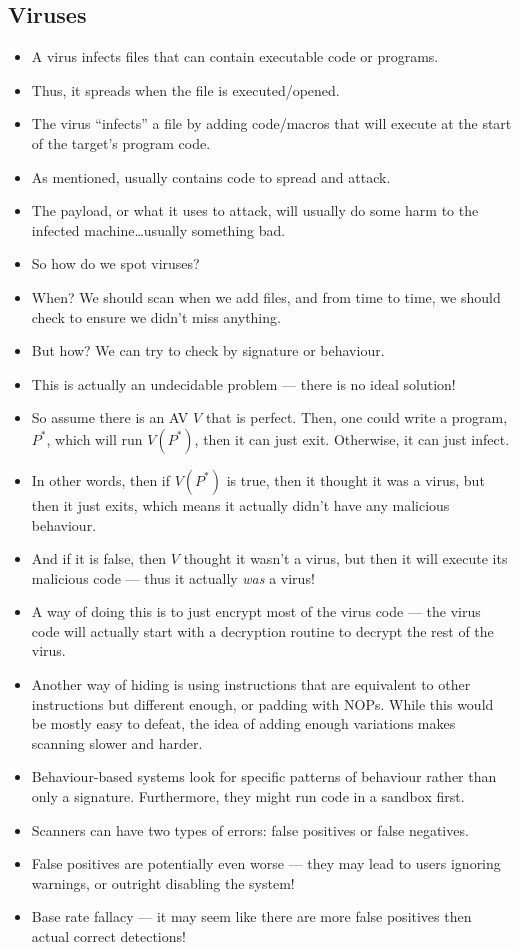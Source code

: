 \documentclass{article}
\begin{document}
\subsection{Viruses}
\begin{itemize}
    \item A virus infects files that can contain executable code or programs.
    \item Thus, it spreads when the file is executed/opened.
    \item The virus ``infects'' a file by adding code/macros that will execute at the start of the target's program code.
    \item As mentioned, usually contains code to spread and attack.
    \item The payload, or what it uses to attack, will usually do some harm to the infected machine\dots usually something bad.
    \item So how do we spot viruses?
    \item When?  We should scan when we add files, and from time to time, we should check to ensure we didn't miss anything.
    \item But how?  We can try to check by signature or behaviour.
    \item This is actually an undecidable problem --- there is no ideal solution!
    \item So assume there is an AV $V$ that is perfect.  Then, one could write a program, $P^*$, which will run $V(P^*)$, then it can just exit.  Otherwise, it can just infect.
    \item In other words, then if $V(P^*)$ is true, then it thought it was a virus, but then it just exits, which means it actually didn't have any malicious behaviour.
    \item And if it is false, then $V$ thought it wasn't a virus, but then it will execute its malicious code --- thus it actually \emph{was} a virus!
    \item A way of doing this is to just encrypt most of the virus code --- the virus code will actually start with a decryption routine to decrypt the rest of the virus.
    \item Another way of hiding is using instructions that are equivalent to other instructions but different enough, or padding with NOPs.  While this would be mostly easy to defeat, the idea of adding enough variations makes scanning slower and harder.
    \item Behaviour-based systems look for specific patterns of behaviour rather than only a signature.  Furthermore, they might run code in a sandbox first.
    \item Scanners can have two types of errors: false positives or false negatives.
    \item False positives are potentially even worse --- they may lead to users ignoring warnings, or outright disabling the system!
    \item Base rate fallacy --- it may seem like there are more false positives then actual correct detections! 
\end{itemize}
\end{document}
